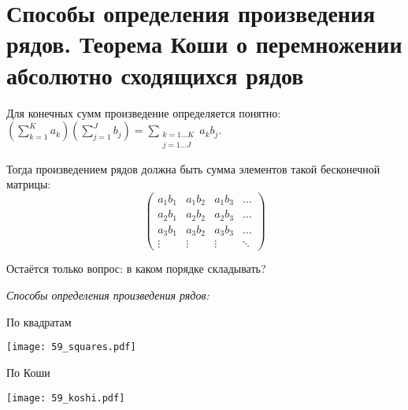 \documentclass[../main.tex]{subfiles}
\begin{document}
\newpage
\section{Способы определения произведения рядов. Теорема Коши о перемножении абсолютно сходящихся рядов}

Для конечных сумм произведение определяется понятно: \( \left(\sum\limits_{ k=1}^{ K} a_k\right)\left( \sum\limits_{ j=1}^{ J} b_j\right)= \sum\limits_{ \substack{k=1 \ldots K\\ j=1 \ldots J}}^{ } a_kb_j\). 

Тогда произведением рядов должна быть сумма элементов такой бесконечной матрицы: 
\begin{equation*}
    \begin{pmatrix}
        a_1b_1 & a_1b_2 & a_1b_3 & \dots \\
        a_2b_1 & a_2b_2 & a_2b_3 & \dots \\
        a_3b_1 & a_3b_2 & a_3b_3 & \dots \\ 
        \vdots & \vdots & \vdots & \ddots
    \end{pmatrix}
\end{equation*}

Остаётся только вопрос: в каком порядке складывать?

\begin{center}
    \emph{Способы определения произведения рядов:} 
\end{center}

\begin{minipage}{0.5\textwidth}
    \begin{center}
        По квадратам

        \texttt{[image: 59\_squares.pdf]}
    \end{center}
  \end{minipage}
  \begin{minipage}{0.5\textwidth}
    \begin{center}
        По Коши

        \texttt{[image: 59\_koshi.pdf]} 
    \end{center}
  \end{minipage}
\end{document}

